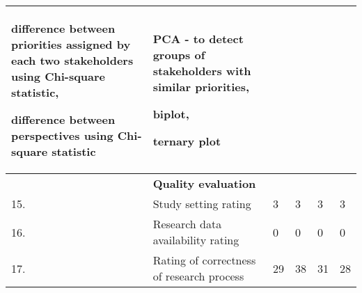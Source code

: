 \begin{table}[ht]
{\begin{tabular}{|>{\raggedright}p{}|>{\raggedright}p{}|>{\raggedright}p{}|>{\raggedright}p{}|>{\raggedright}p{}|>{\raggedright}p{}|}
difference between priorities assigned  by each two stakeholders using Chi-square statistic,

difference between perspectives using Chi-square statistic

&
PCA - to detect groups of stakeholders with similar priorities,

biplot,

ternary plot 
& \tabularnewline
\hline 
 & \textbf{Quality evaluation} &  &  &  & \tabularnewline
\hline 
15. & Study setting rating & 3 & 3 & 3 & 3\tabularnewline
\hline 
16. & Research data availability rating & 0 & 0 & 0 & 0\tabularnewline
\hline 
17. & Rating of correctness of research process & 29 & 38 & 31  & 28\tabularnewline
\hline
\end{tabular}%
}
\end{table}
